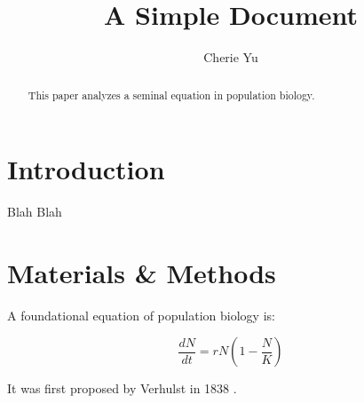 \documentclass[12pt] {article}
\title{A Simple Document}
\author{Cherie Yu}
\date{}
\begin{document}
	\maketitle
	
	\begin {abstract}
		This paper analyzes a seminal equation in population biology. 
	\end {abstract}
	
	\section {Introduction}
		Blah Blah
	
	\section {Materials \& Methods}
	
	A foundational equation of population biology is:
	
	\begin {equation}
		\frac{dN}{dt} = r N (1-\frac{N}{K})
	\end{equation}
	
	It was first proposed by Verhulst in 1838  \cite{verhulst1838notice}.
	
	
	
	
	
\end{document}

